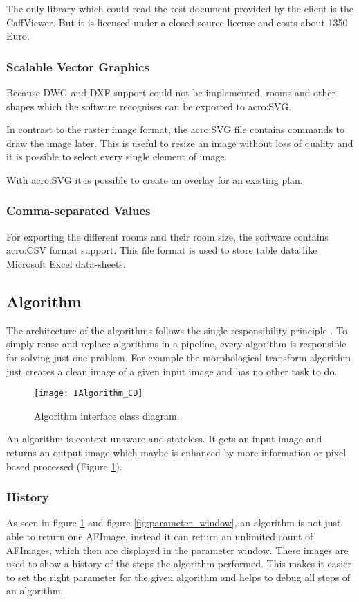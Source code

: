 The only library which could read the test document provided by the client is the CaffViewer. But it is licensed under a closed source license and costs about 1350 Euro.

\subsubsection{Scalable Vector Graphics}
Because DWG and DXF support could not be implemented, rooms and other shapes which the software recognises can be exported to \gls{acro:SVG}.

In contrast to the raster image format, the \gls{acro:SVG} file contains commands to draw the image later. This is useful to resize an image without loss of quality and it is possible to select every single element of image.

With \gls{acro:SVG} it is possible to create an overlay for an existing plan.

\subsubsection{Comma-separated Values}
For exporting the different rooms and their room size, the software contains \gls{acro:CSV} format support. This file format is used to store table data like Microsoft Excel data-sheets.

\pagebreak
\subsection{Algorithm}
The architecture of the algorithms follows the single responsibility principle \citep[p.~484]{mclaughlin_pollice_west_2010}. To simply reuse and replace algorithms in a pipeline, every algorithm is responsible for solving just one problem. For example the morphological transform algorithm just creates a clean image of a given input image and has no other task to do.

\begin{figure}[h]
  \centering
      \texttt{[image: IAlgorithm\_CD]}
  \caption{Algorithm interface class diagram.}
  \label{fig:IAlgorithm_CD}
\end{figure}

An algorithm is context unaware and stateless. It gets an input image and returns an output image which maybe is enhanced by more information or pixel based processed (Figure \ref{fig:IAlgorithm_CD}).

\subsubsection{History}
As seen in figure \ref{fig:IAlgorithm_CD} and figure \ref{fig:parameter_window}, an algorithm is not just able to return one AFImage, instead it can return an unlimited count of AFImages, which then are displayed in the parameter window. These images are used to show a history of the steps the algorithm performed. This makes it easier to set the right parameter for the given algorithm and helps to debug all steps of an algorithm.

